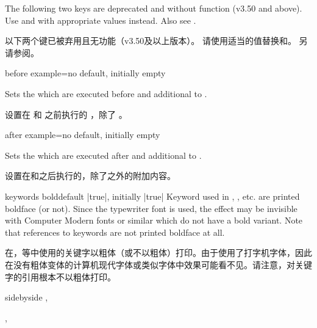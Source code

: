 \begin{marker}
The following two keys are deprecated and without function (v3.50 and above).
Use  and  with appropriate values
instead. Also see .

以下两个键已被弃用且无功能（v3.50及以上版本）。 请使用适当的值替换和。 另请参阅。
\end{marker}

\begin{docTcbKey}[][doc updated=2015-03-16]{before example}{=}{no default, initially empty}
\smallskip\begin{deprecated}
Sets the  which are executed before  and 
additional to .

设置在  和  之前执行的 ，除了 。
\end{deprecated}
\end{docTcbKey}


\begin{docTcbKey}{after example}{=}{no default, initially empty}
\smallskip\begin{deprecated}
Sets the  which are executed after  and 
additional to .

设置在和之后执行的，除了之外的附加内容。
\end{deprecated}
\end{docTcbKey}

\begin{docTcbKey}[][doc new=2017-04-25]{keywords bold}{}{default |true|, initially |true|}
Keyword used in , , etc. are printed
boldface (or not). Since the typewriter font is used, the effect may be
invisible with Computer Modern fonts or similar which do not
have a bold variant. Note that references to keywords are not printed boldface at all.

在，等中使用的关键字以粗体（或不以粗体）打印。由于使用了打字机字体，因此在没有粗体变体的计算机现代字体或类似字体中效果可能看不见。请注意，对关键字的引用根本不以粗体打印。
\begin{dispExample*}{sidebyside}
\LARGE
{}, 

, 
\end{dispExample*}
\end{docTcbKey}



